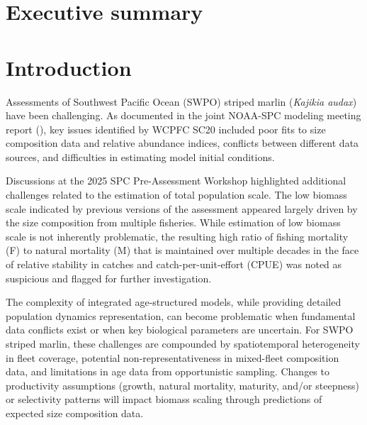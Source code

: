 \documentclass[
  11pt,
]{SCreport}
\begin{document}
\newpage

\section{Executive summary}\label{executive-summary}

\newpage

\section{Introduction}\label{sec-introduction}

Assessments of Southwest Pacific Ocean (SWPO) striped marlin
(\emph{Kajikia audax}) have been challenging. As documented in the joint
NOAA-SPC modeling meeting report
(), key issues identified by WCPFC SC20 included poor fits to size
composition data and relative abundance indices, conflicts between
different data sources, and difficulties in estimating model initial
conditions.

Discussions at the 2025 SPC Pre-Assessment Workshop highlighted
additional challenges related to the estimation of total population
scale. The low biomass scale indicated by previous versions of the
assessment appeared largely driven by the size composition from multiple
fisheries. While estimation of low biomass scale is not inherently
problematic, the resulting high ratio of fishing mortality (F) to
natural mortality (M) that is maintained over multiple decades in the
face of relative stability in catches and catch-per-unit-effort (CPUE)
was noted as suspicious and flagged for further investigation.

The complexity of integrated age-structured models, while providing
detailed population dynamics representation, can become problematic when
fundamental data conflicts exist or when key biological parameters are
uncertain. For SWPO striped marlin, these challenges are compounded by
spatiotemporal heterogeneity in fleet coverage, potential
non-representativeness in mixed-fleet composition data, and limitations
in age data from opportunistic sampling. Changes to productivity
assumptions (growth, natural mortality, maturity, and/or steepness) or
selectivity patterns will impact biomass scaling through predictions of
expected size composition data.
\end{document}
